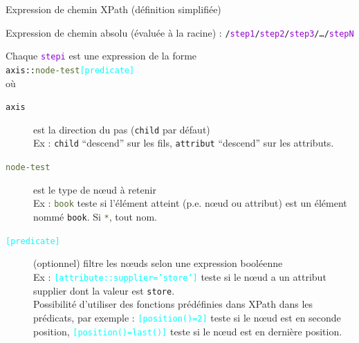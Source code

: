 \begin{frame}{Expression de chemin XPath (d\'efinition simplifi\'ee)}

Expression de chemin absolu (\'evalu\'ee à la racine) : 
\texttt{/\textcolor{DarkViolet}{step1}/\textcolor{DarkViolet}{step2}/\textcolor{DarkViolet}{step3}/…/\textcolor{DarkViolet}{stepN}}
\\

\medskip 

\noindent Chaque \texttt{\textcolor{DarkViolet}{stepi}} est une expression de la forme \\
\texttt{\textcolor{indiaRed}{axis}::\textcolor{DarkOliveGreen}{node-test}\textcolor{cyan}{[predicate]}
}\\
 o\`u

\begin{description}
\item[\texttt{\textcolor{indiaRed}{axis}}] est la direction du pas (\texttt{\textcolor{indiaRed}{child}}  par d\'efaut)\\
Ex : \texttt{\textcolor{indiaRed}{child}} ``descend'' sur les fils, \texttt{\textcolor{indiaRed}{attribut}} ``descend'' sur les attributs.
\item[\texttt{\textcolor{DarkOliveGreen}{node-test}}] est le type de nœud à retenir\\
Ex : \texttt{\textcolor{DarkOliveGreen}{book}} teste si l'\'el\'ement atteint (p.e. nœud ou attribut) est un \'el\'ement nomm\'e \texttt{book}.
Si \texttt{\textcolor{DarkOliveGreen}{*}},  tout nom.
\item[\texttt{\textcolor{cyan}{[predicate]}}] (optionnel) filtre les nœuds selon une expression bool\'eenne \\
	Ex : \texttt{\textcolor{cyan}{[attribute::supplier='store']}} teste si le nœud a un attribut supplier dont la valeur est \texttt{store}.\\
	Possibilit\'e d'utiliser des fonctions pr\'ed\'efinies dans XPath dans les pr\'edicats, par exemple : \texttt{\textcolor{cyan}{[position()=2]}} teste si le nœud est en seconde position, \texttt{\textcolor{cyan}{[position()=last()]}} teste si le nœud est en derni\`ere position.\\
\end{description}

\end{frame}

